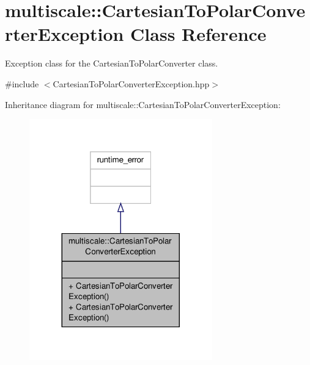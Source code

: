 \hypertarget{classmultiscale_1_1CartesianToPolarConverterException}{\section{multiscale\-:\-:Cartesian\-To\-Polar\-Converter\-Exception Class Reference}
\label{classmultiscale_1_1CartesianToPolarConverterException}
}


Exception class for the Cartesian\-To\-Polar\-Converter class.  




{\ttfamily \#include $<$Cartesian\-To\-Polar\-Converter\-Exception.\-hpp$>$}



Inheritance diagram for multiscale\-:\-:Cartesian\-To\-Polar\-Converter\-Exception\-:\nopagebreak
\begin{figure}[H]
\begin{center}
\leavevmode
\includegraphics[width=224pt]{classmultiscale_1_1CartesianToPolarConverterException__inherit__graph}
\end{center}
\end{figure}


